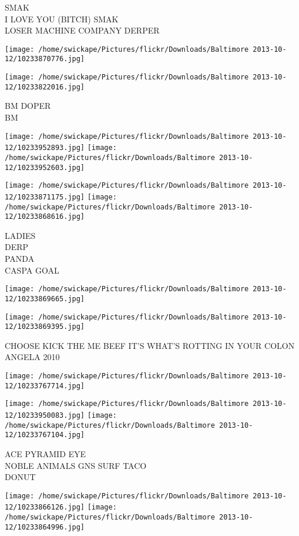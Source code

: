 \documentclass[10pt,letterpaper]{article}
\begin{document}
SMAK\\
I LOVE YOU (BITCH) SMAK\\
LOSER MACHINE COMPANY DERPER
\pagebreak

\texttt{[image: /home/swickape/Pictures/flickr/Downloads/Baltimore 2013-10-12/10233870776.jpg]}

\vspace{0.25in}
\texttt{[image: /home/swickape/Pictures/flickr/Downloads/Baltimore 2013-10-12/10233822016.jpg]}

BM DOPER\\
BM
\pagebreak

\texttt{[image: /home/swickape/Pictures/flickr/Downloads/Baltimore 2013-10-12/10233952893.jpg]}
\texttt{[image: /home/swickape/Pictures/flickr/Downloads/Baltimore 2013-10-12/10233952603.jpg]}

\texttt{[image: /home/swickape/Pictures/flickr/Downloads/Baltimore 2013-10-12/10233871175.jpg]}
\texttt{[image: /home/swickape/Pictures/flickr/Downloads/Baltimore 2013-10-12/10233868616.jpg]}

LADIES\\
DERP\\
PANDA\\
CASPA GOAL
\pagebreak

\texttt{[image: /home/swickape/Pictures/flickr/Downloads/Baltimore 2013-10-12/10233869665.jpg]}

\vspace{0.25in}
\texttt{[image: /home/swickape/Pictures/flickr/Downloads/Baltimore 2013-10-12/10233869395.jpg]}

CHOOSE KICK THE ME BEEF IT'S WHAT'S ROTTING IN YOUR COLON\\
ANGELA 2010
\pagebreak

\texttt{[image: /home/swickape/Pictures/flickr/Downloads/Baltimore 2013-10-12/10233767714.jpg]}

\vspace{0.25in}
\texttt{[image: /home/swickape/Pictures/flickr/Downloads/Baltimore 2013-10-12/10233950083.jpg]}
\texttt{[image: /home/swickape/Pictures/flickr/Downloads/Baltimore 2013-10-12/10233767104.jpg]}

ACE PYRAMID EYE\\
NOBLE ANIMALS GNS SURF TACO\\
DONUT
\pagebreak

\texttt{[image: /home/swickape/Pictures/flickr/Downloads/Baltimore 2013-10-12/10233866126.jpg]}
\texttt{[image: /home/swickape/Pictures/flickr/Downloads/Baltimore 2013-10-12/10233864996.jpg]}
\end{document}
